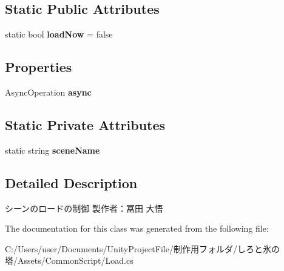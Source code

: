 \subsection*{Static Public Attributes}
\begin{DoxyCompactItemize}
\item 
\mbox{\label{class_load_a0d7ed9e1a1c7ad35581fb77fc684a750}} 
static bool {\bfseries load\+Now} = false
\end{DoxyCompactItemize}
\subsection*{Properties}
\begin{DoxyCompactItemize}
\item 
\mbox{\label{class_load_aff1346dee83cd562f69b9506174eb007}} 
Async\+Operation {\bfseries async}
\end{DoxyCompactItemize}
\subsection*{Static Private Attributes}
\begin{DoxyCompactItemize}
\item 
\mbox{\label{class_load_a2375d7efcd94073ae814bb6dafe63bcb}} 
static string {\bfseries scene\+Name}
\end{DoxyCompactItemize}


\subsection{Detailed Description}
シーンのロードの制御 製作者：冨田 大悟 



The documentation for this class was generated from the following file\+:\begin{DoxyCompactItemize}
\item 
C\+:/\+Users/user/\+Documents/\+Unity\+Project\+File/制作用フォルダ/しろと氷の塔/\+Assets/\+Common\+Script/Load.\+cs\end{DoxyCompactItemize}
